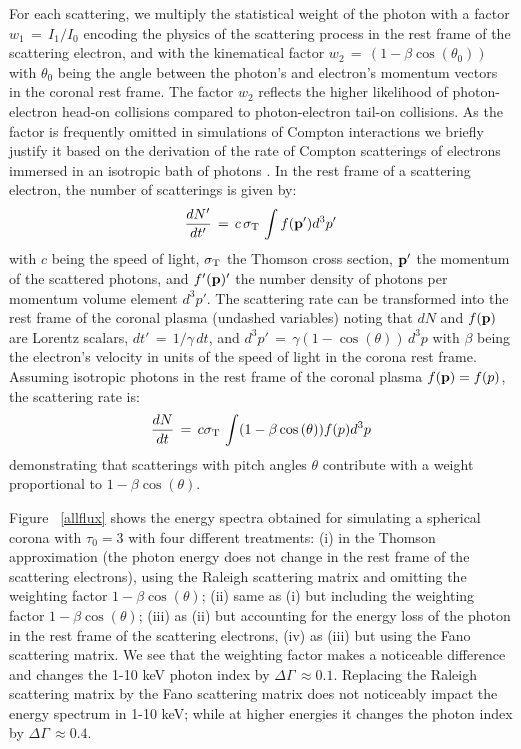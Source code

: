 \documentclass[manuscript]{aastex}
\begin{document}
For each scattering, we multiply the statistical weight of the photon with a factor $w_1\,=\,I_1/I_0$ encoding the
physics of the scattering process in the rest frame of the scattering electron, and with the kinematical 
factor $w_2\,=\, (1-\beta\cos{(\theta_0)})$ with $\theta_0$ being the angle between the photon's and electron's 
momentum vectors in the coronal rest frame.  The factor $w_2$ reflects the higher likelihood of photon-electron 
head-on collisions compared to photon-electron tail-on collisions. As the factor is frequently omitted 
in simulations of Compton interactions we briefly justify it based on the derivation of the rate of 
Compton scatterings of electrons immersed in an isotropic bath of photons \citep{bic17,blu70,zdz91}. 
In the rest frame of a scattering electron, the number of scatterings is given by:
\begin{equation}
\frac{dN'}{dt'}\,=\,c\,\sigma_{\rm T}\,\int f({\bf p}') d^3 p'
\end{equation}
with $c$ being the speed of light, $\sigma_{\rm T}$ the Thomson cross section, ${\bf p}'$ the momentum of the scattered photons, and $f'({\bf p})'$ the number density of photons per momentum volume element $d^3 p'$. The scattering rate can be transformed into the rest frame of the coronal plasma (undashed variables) noting that $dN$ and $f({\bf p})$ are Lorentz scalars, $dt'\,=\,1/\gamma\,dt$, and $d^3p'\,=\,\gamma(1-\cos{(\theta)})\,d^3p$ with $\beta$ being the electron's velocity in units of the speed of light in the corona rest frame. Assuming isotropic photons in the rest frame of the coronal plasma $f({\bf p})=f(p)$, the scattering rate is:
\begin{equation}
\frac{dN}{dt}\,=\,
c\sigma_{\rm T}\,\int (1-\beta\cos{(\theta)}) f(p) d^3p
\label{rate}
\end{equation}
demonstrating that scatterings with pitch angles $\theta$ contribute with a weight proportional to $1-\beta\cos{(\theta)}$.

Figure ~\ref{allflux} shows the energy spectra obtained for simulating a spherical corona with $\tau_0=3$ with four different treatments: 
(i) in the Thomson approximation (the photon energy does not change in the rest frame of the scattering electrons),
using the Raleigh scattering matrix and omitting the weighting factor $1-\beta\cos{(\theta)}$;
(ii) same as (i) but including the weighting factor $1-\beta\cos{(\theta)}$;
(iii) as (ii) but accounting for the energy loss of the photon in the rest frame of the scattering electrons,
(iv) as (iii) but using the Fano scattering matrix.  
We see that the weighting factor makes a noticeable difference and changes the 1-10 keV photon index by
$\Delta\Gamma\,\approx0.1$. 
Replacing the Raleigh scattering matrix by the Fano scattering matrix does not noticeably impact the energy spectrum in 1-10 keV; while at higher energies it changes the photon index by $\Delta\Gamma\,\approx0.4$. 
\end{document}
